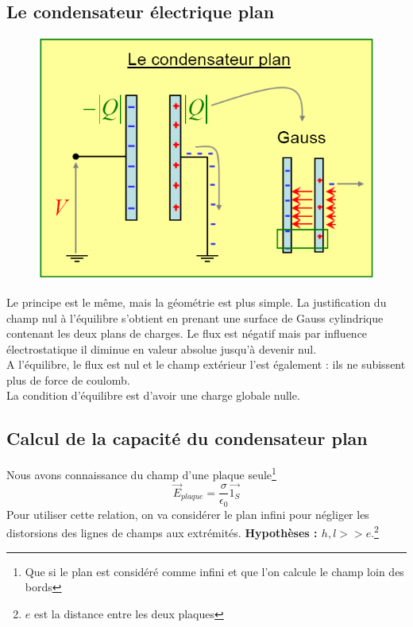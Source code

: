 \documentclass	[11pt, a4paper, openany]{book}
\begin{document}
\subsection{Le condensateur électrique plan}
\begin{figure}
	\includegraphics[scale=0.24]{es/image14.png}
\end{figure}
Le principe est le même, mais la géométrie est plus simple.  La justification du champ nul à l'équilibre s'obtient en prenant une surface de Gauss cylindrique contenant les deux plans de charges. Le flux est négatif mais par influence électrostatique il diminue en valeur absolue jusqu'à devenir nul.\\
A l'équilibre, le flux est nul et le champ extérieur l'est également : ils ne subissent plus de force de coulomb.\\
La condition d'équilibre est d'avoir une charge globale nulle.

\subsection{Calcul de la capacité du condensateur plan}
Nous avons connaissance du champ d'une plaque seule\footnote{Que si le plan est considéré comme infini et que l'on calcule le champ loin des bords}
\begin{equation}
	\vec{E}_{plaque} = \frac{\sigma}{\epsilon_0}\vec{1_S}
\end{equation}
Pour utiliser cette relation, on va considérer le plan infini pour négliger les distorsions des lignes de champs aux extrémités. \textbf{Hypothèses : $h, l >> e$}.\footnote{$e$ est la distance entre les deux plaques}
\end{document}
